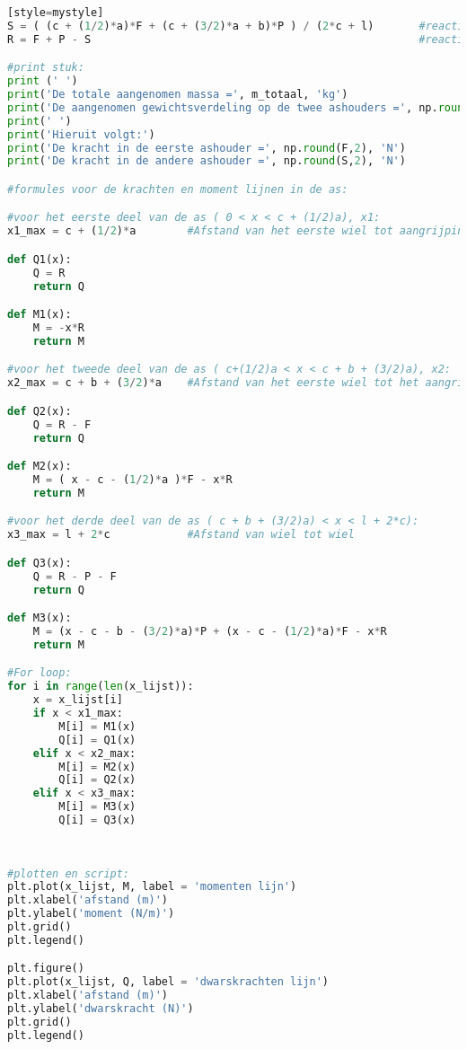 \begin{lstlisting}[language=Python][style=mystyle]
S = ( (c + (1/2)*a)*F + (c + (3/2)*a + b)*P ) / (2*c + l)       #reactiekracht bij het eerste wiel , Newton
R = F + P - S                                                   #reactiekracht bij het tweede wiel, Newton

#print stuk:
print (' ')
print('De totale aangenomen massa =', m_totaal, 'kg')
print('De aangenomen gewichtsverdeling op de twee ashouders =', np.round(verdeling_gewicht, 3), 'tot', np.round(1 - verdeling_gewicht, 3), 'respectievelijk')
print(' ')
print('Hieruit volgt:')
print('De kracht in de eerste ashouder =', np.round(F,2), 'N')
print('De kracht in de andere ashouder =', np.round(S,2), 'N')

#formules voor de krachten en moment lijnen in de as:

#voor het eerste deel van de as ( 0 < x < c + (1/2)a), x1:
x1_max = c + (1/2)*a        #Afstand van het eerste wiel tot aangrijpingspunt van de kracht bij de eerste ashouder

def Q1(x):
    Q = R
    return Q

def M1(x):
    M = -x*R
    return M

#voor het tweede deel van de as ( c+(1/2)a < x < c + b + (3/2)a), x2:
x2_max = c + b + (3/2)*a    #Afstand van het eerste wiel tot het aangrijpingspunt van de kracht bij de tweede ashouder

def Q2(x):
    Q = R - F
    return Q

def M2(x):
    M = ( x - c - (1/2)*a )*F - x*R
    return M

#voor het derde deel van de as ( c + b + (3/2)a) < x < l + 2*c):
x3_max = l + 2*c            #Afstand van wiel tot wiel

def Q3(x):
    Q = R - P - F
    return Q

def M3(x):
    M = (x - c - b - (3/2)*a)*P + (x - c - (1/2)*a)*F - x*R
    return M

#For loop:
for i in range(len(x_lijst)):
    x = x_lijst[i]
    if x < x1_max:
        M[i] = M1(x)
        Q[i] = Q1(x)
    elif x < x2_max:
        M[i] = M2(x)
        Q[i] = Q2(x)
    elif x < x3_max:
        M[i] = M3(x)
        Q[i] = Q3(x)
      
    
    
#plotten en script:
plt.plot(x_lijst, M, label = 'momenten lijn')
plt.xlabel('afstand (m)')
plt.ylabel('moment (N/m)')
plt.grid()
plt.legend()

plt.figure()
plt.plot(x_lijst, Q, label = 'dwarskrachten lijn')
plt.xlabel('afstand (m)')
plt.ylabel('dwarskracht (N)')
plt.grid()
plt.legend()


\end{lstlisting}
